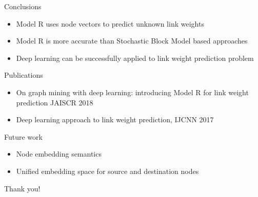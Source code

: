 \documentclass{beamer}
\begin{document}
\begin{frame}{Conclusions}
	\begin{itemize}
		\item Model R uses node vectors to predict unknown link weights
		\item Model R is more accurate than Stochastic Block Model based approaches
		\item Deep learning can be successfully applied to link weight prediction problem
	\end{itemize}
\end{frame}

\begin{frame}{Publications}
	\begin{itemize}
		\item On graph mining with deep learning: introducing Model R for link weight prediction JAISCR 2018
		\item Deep learning approach to link weight prediction, IJCNN 2017
	\end{itemize}
\end{frame}

\begin{frame}{Future work}
	\begin{itemize}
		\item Node embedding semantics
		\item Unified embedding space for source and destination nodes
	\end{itemize}
\end{frame}

\begin{frame}
	\begin{center}
		\Huge Thank you!
	\end{center}
\end{frame}
\end{document}
